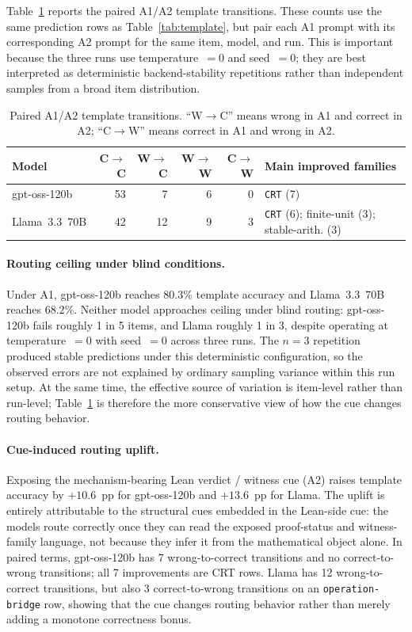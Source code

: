 \documentclass[11pt]{article}
\begin{document}
Table~\ref{tab:paired-transitions} reports the paired A1/A2 template
transitions. These counts use the same prediction rows as
Table~\ref{tab:template}, but pair each A1 prompt with its corresponding A2
prompt for the same item, model, and run. This is important because the three
runs use temperature~$=0$ and seed~$=0$; they are best interpreted as
deterministic backend-stability repetitions rather than independent samples
from a broad item distribution.

\begin{table}[htbp]
\centering
\caption{Paired A1/A2 template transitions. ``W$\to$C'' means wrong in A1 and
         correct in A2; ``C$\to$W'' means correct in A1 and wrong in A2.}
\label{tab:paired-transitions}
\begin{tabular}{lrrrrl}
\toprule
\textbf{Model} & \textbf{C$\to$C} & \textbf{W$\to$C}
  & \textbf{W$\to$W} & \textbf{C$\to$W} & \textbf{Main improved families} \\
\midrule
gpt-oss-120b & 53 & 7 & 6 & 0 & \texttt{CRT} (7) \\
Llama~3.3~70B & 42 & 12 & 9 & 3
  & \texttt{CRT} (6); finite-unit (3); stable-arith. (3) \\
\bottomrule
\end{tabular}
\end{table}

\paragraph{Routing ceiling under blind conditions.}
Under A1, gpt-oss-120b reaches $80.3\%$ template accuracy and Llama~3.3~70B
reaches $68.2\%$.
Neither model approaches ceiling under blind routing: gpt-oss-120b fails
roughly 1 in 5 items, and Llama roughly 1 in 3, despite operating at
temperature~$= 0$ with seed~$= 0$ across three runs.
The $n=3$ repetition produced stable predictions under this deterministic
configuration, so the observed errors are not explained by ordinary sampling
variance within this run setup.
At the same time, the effective source of variation is item-level rather than
run-level; Table~\ref{tab:paired-transitions} is therefore the more
conservative view of how the cue changes routing behavior.

\paragraph{Cue-induced routing uplift.}
Exposing the mechanism-bearing Lean verdict / witness cue (A2) raises template
accuracy by $+10.6$~pp for gpt-oss-120b and $+13.6$~pp for Llama.
The uplift is entirely attributable to the structural cues embedded in the
Lean-side cue: the models route correctly once they can read the exposed
proof-status and witness-family language, not because they infer it from the
mathematical object alone.
In paired terms, gpt-oss-120b has 7 wrong-to-correct transitions and no
correct-to-wrong transitions; all 7 improvements are CRT rows. Llama has 12
wrong-to-correct transitions, but also 3 correct-to-wrong transitions on an
\texttt{operation{-}bridge} row, showing that the cue changes routing behavior
rather than merely adding a monotone correctness bonus.
\end{document}
